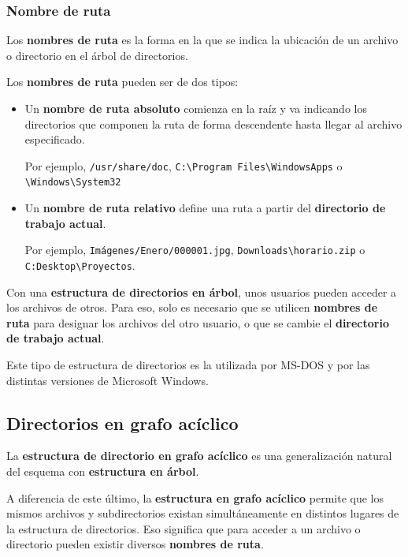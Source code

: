 \subsubsection{Nombre de ruta}\label{_nombre_de_ruta}

{} Los \textbf{nombres de ruta} es la forma en la que se indica la
ubicación de un archivo o directorio en el árbol de directorios.

Los \textbf{nombres de ruta} pueden ser de dos tipos:

\begin{itemize}
\item
  Un \textbf{nombre de ruta absoluto}{} comienza en la raíz y va
  indicando los directorios que componen la ruta de forma descendente
  hasta llegar al archivo especificado.

  Por ejemplo, \texttt{/usr/share/doc},
  \texttt{C:\textbackslash{}Program\ Files\textbackslash{}WindowsApps} o
  \texttt{\textbackslash{}Windows\textbackslash{}System32}
\item
  Un \textbf{nombre de ruta relativo}{} define una ruta a partir del
  \textbf{directorio de trabajo actual}.

  Por ejemplo, \texttt{Imágenes/Enero/000001.jpg},
  \texttt{Downloads\textbackslash{}horario.zip} o
  \texttt{C:Desktop\textbackslash{}Proyectos}.
\end{itemize}

Con una \textbf{estructura de directorios en árbol}, unos usuarios
pueden acceder a los archivos de otros. Para eso, solo es necesario que
se utilicen \textbf{nombres de ruta} para designar los archivos del otro
usuario, o que se cambie el \textbf{directorio de trabajo actual}.

Este tipo de estructura de directorios es la utilizada por MS-DOS y por
las distintas versiones de Microsoft Windows.

\subsection{Directorios en grafo
acíclico}\label{_directorios_en_grafo_acuxedclico}

La \textbf{estructura de directorio en grafo acíclico} es una
generalización natural del esquema con \textbf{estructura en árbol}.

A diferencia de este último, la \textbf{estructura en grafo acíclico}
permite que los mismos archivos y subdirectorios existan simultáneamente
en distintos lugares de la estructura de directorios. Eso significa que
para acceder a un archivo o directorio pueden existir diversos
\textbf{nombres de ruta}.

